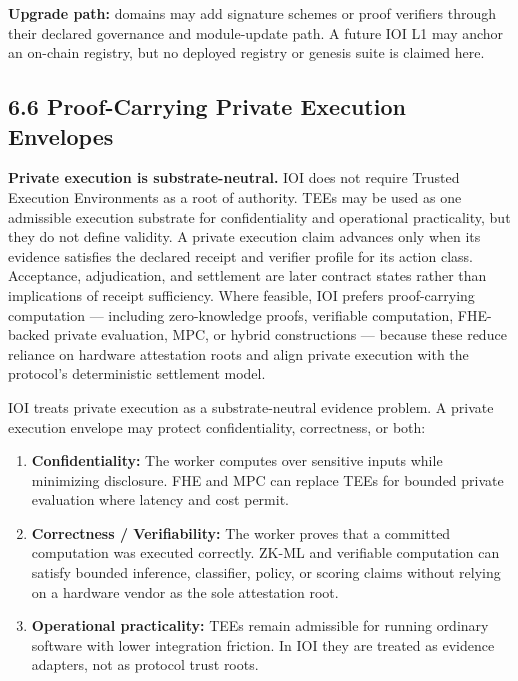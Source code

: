 \documentclass[
  11pt,
]{article}
\providecommand{\tightlist}{%
  \setlength{\itemsep}{0pt}\setlength{\parskip}{0pt}}
\begin{document}
\textbf{Upgrade path: }domains may add signature schemes or proof verifiers
through their declared governance and module-update path. A future IOI L1 may
anchor an on-chain registry, but no deployed registry or genesis suite is
claimed here.

\hypertarget{proof-carrying-private-execution-envelopes}{%
\subsection{6.6 Proof-Carrying Private Execution
Envelopes}\label{proof-carrying-private-execution-envelopes}}

\textbf{Private execution is substrate-neutral.} IOI does not require
Trusted Execution Environments as a root of authority. TEEs may be used
as one admissible execution substrate for confidentiality and
operational practicality, but they do not define validity. A private
execution claim advances only when its evidence satisfies the declared
receipt and verifier profile for its action class. Acceptance, adjudication,
and settlement are later contract states rather than implications of receipt
sufficiency. Where feasible,
IOI prefers proof-carrying computation --- including zero-knowledge
proofs, verifiable computation, FHE-backed private evaluation, MPC, or
hybrid constructions --- because these reduce reliance on hardware
attestation roots and align private execution with the protocol's
deterministic settlement model.

IOI treats private execution as a substrate-neutral evidence problem. A
private execution envelope may protect confidentiality, correctness, or
both:

\begin{enumerate}
\def\labelenumi{\arabic{enumi}.}
\tightlist
\item
  \textbf{Confidentiality:} The worker computes over sensitive inputs
  while minimizing disclosure. FHE and MPC can replace TEEs for bounded
  private evaluation where latency and cost permit.
\item
  \textbf{Correctness / Verifiability:} The worker proves that a
  committed computation was executed correctly. ZK-ML and verifiable
  computation can satisfy bounded inference, classifier, policy, or
  scoring claims without relying on a hardware vendor as the sole
  attestation root.
\item
  \textbf{Operational practicality:} TEEs remain admissible for running
  ordinary software with lower integration friction. In IOI they are
  treated as evidence adapters, not as protocol trust roots.
\end{enumerate}
\end{document}

